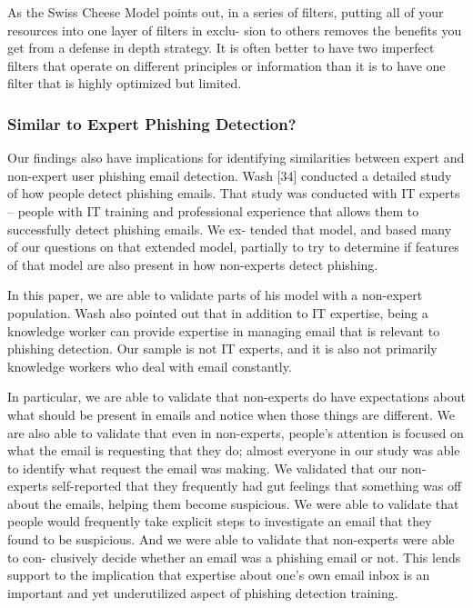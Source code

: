 \documentclass[lettersize,journal]{IEEEtran}
\begin{document}
As the Swiss Cheese Model points out, in a series of filters, putting all of
your resources into one layer of filters in exclu- sion to others removes the
benefits you get from a defense in depth strategy. It is often better to have
two imperfect filters that operate on different principles or information than
it is to have one filter that is highly optimized but limited.

\subsubsection{Similar to Expert Phishing Detection?}

Our findings also have implications for identifying similarities between expert
and non-expert user phishing email detection. Wash [34] conducted a detailed
study of how people detect phishing emails. That study was conducted with IT
experts – people with IT training and professional experience that allows them
to successfully detect phishing emails. We ex- tended that model, and based
many of our questions on that extended model, partially to try to determine if
features of that model are also present in how non-experts detect phishing.

In this paper, we are able to validate parts of his model with a non-expert
population. Wash also pointed out that in addition to IT expertise, being a
knowledge worker can provide expertise in managing email that is relevant to
phishing detection. Our sample is not IT experts, and it is also not primarily
knowledge workers who deal with email constantly.

In particular, we are able to validate that non-experts do have expectations
about what should be present in emails and notice when those things are
different. We are also able to validate that even in non-experts, people’s
attention is focused on what the email is requesting that they do; almost
everyone in our study was able to identify what request the email was making.
We validated that our non-experts self-reported that they frequently had gut
feelings that something was off about the emails, helping them become
suspicious. We were able to validate that people would frequently take explicit
steps to investigate an email that they found to be suspicious. And we were
able to validate that non-experts were able to con- clusively decide whether an
email was a phishing email or not. This lends support to the implication that
expertise about one’s own email inbox is an important and yet underutilized
aspect of phishing detection training.
\end{document}
